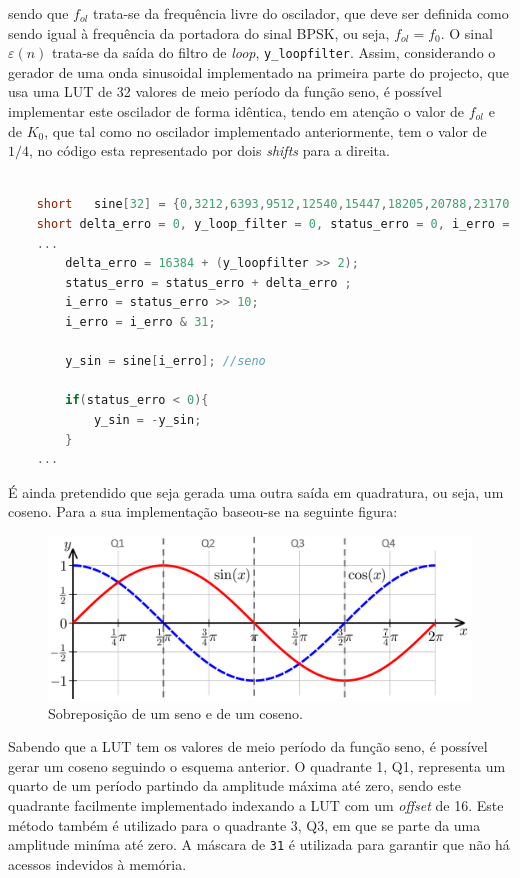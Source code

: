 \documentclass[11pt]{article}
\numberwithin{equation}{section}
\begin{document}
\vspace{1mm}
sendo que $f_{ol}$ trata-se da frequência livre do oscilador, que deve ser definida como sendo igual à frequência da portadora do sinal BPSK, ou seja, $f_{ol} = f_0$. O sinal $\varepsilon (n)$ trata-se da saída do filtro de \textit{loop}, \texttt{y\_loopfilter}. 
Assim, considerando o gerador de uma onda sinusoidal implementado na primeira parte do projecto, que usa uma LUT de 32 valores de meio período da função seno, é possível implementar este oscilador de forma idêntica, tendo em atenção o valor de $f_{ol}$ e de $K_0$, que tal como no oscilador implementado anteriormente, tem o valor de $1/4$, no código esta representado por dois \textit{shifts} para a direita.
\begin{lstlisting}[language=C]

	short	sine[32] = {0,3212,6393,9512,12540,15447,18205,20788,23170,25330,27246,28899,30274,31357,		32138,32610,32767,32610,32138,31357,30274,28899,27246,25330,23170,20788,18205,		15447,12540,9512,6393,3212}; 
	short delta_erro = 0, y_loop_filter = 0, status_erro = 0, i_erro = 0, y_sin = 0;
	...
		delta_erro = 16384 + (y_loopfilter >> 2);
		status_erro = status_erro + delta_erro ;
		i_erro = status_erro >> 10;
		i_erro = i_erro & 31;
		
		y_sin = sine[i_erro]; //seno
		
		if(status_erro < 0){
			y_sin = -y_sin;
		}	
	...

\end{lstlisting}

É ainda pretendido que seja gerada uma outra saída em quadratura, ou seja, um coseno. Para a sua implementação baseou-se na seguinte figura:
 \begin{figure}[H]
 	\centering
 	\includegraphics[keepaspectratio=true, scale=0.30]{teoricas/senocoseno}
 	\caption{Sobreposição de um seno e de um coseno.}
 	\vspace{-0.8em}
 \end{figure}
 
Sabendo que a LUT tem os valores de meio período da função seno, é possível gerar um coseno seguindo o esquema anterior. O quadrante 1, Q1, representa um quarto de um período partindo da amplitude máxima até zero, sendo este quadrante facilmente implementado  indexando a LUT com um \textit{offset} de 16. Este método também  é utilizado para o quadrante 3, Q3, em que se parte da uma amplitude miníma até zero. A máscara de \texttt{31} é utilizada para garantir que não há acessos indevidos à memória.
 
\end{document}
